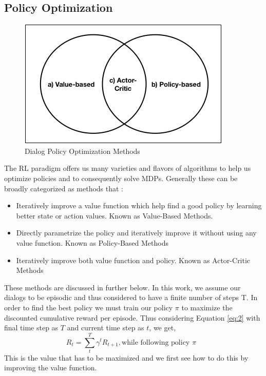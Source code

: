 \documentclass[12pt]{extarticle}
\numberwithin{equation}{section}
\begin{document}
	\subsection{Policy Optimization}\label{policy-opt}
	\begin{figure}[H]
		\centering
		\includegraphics[scale=0.7]{mdp_methods}
		\caption{Dialog Policy Optimization Methods
			\label{mdp-methods}}
	\end{figure}
	The RL paradigm offers us many varieties and flavors of algorithms\cite{rl_overview} to help us optimize policies and to consequently solve MDPs. Generally these can be broadly categorized as methods that :
	\begin{itemize}
		\item Iteratively improve a value function which help find a good policy by learning better state or action values. Known as Value-Based Methods.
		\item Directly parametrize the policy and iteratively improve it without using any value function. Known as Policy-Based Methods
		\item Iteratively improve both value function and policy. Known as Actor-Critic Methods
	\end{itemize}
	These methods are discussed in further below. In this work, we assume our dialogs to be episodic and thus considered to have a finite number of steps T. In order to find the best policy we must train our policy $\pi$ to maximize the discounted cumulative reward per episode. Thus considering Equation \ref{eq:2} with final time step as $T$ and current time step as $t$, we get,
	\begin{equation}
	R_t =\sum_{t}^{T} { \gamma ^{t} R_{t+1}}, \text{while following policy $\pi$ } \nonumber
	\end{equation}
	This is the value that has to be maximized and we first see how to do this by improving the value function.
\end{document}

